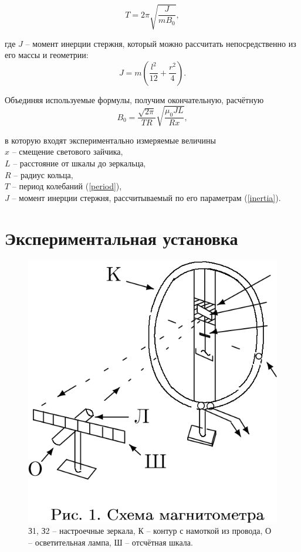 \documentclass[a4paper, 12pt]{article}
\begin{document}
\begin{equation}\label{period}
T = 2\pi\sqrt{\frac{J}{mB_0}},
\end{equation}

где $J$ -- момент инерции стержня, который можно рассчитать непосредственно из его массы и геометрии:
\begin{equation}\label{inertia}
J=m\left(\frac{l^2}{12}+\frac{r^2}{4}\right).
\end{equation}


Объединяя используемые формулы, получим окончательную, расчётную
\begin{equation}
B_0 = \frac{\sqrt{2\pi}}{TR}\sqrt{\frac{\mu_0JL}{Rx}},
\end{equation}

в которую входят экспериментально измеряемые величины\\
$x$ -- смещение светового зайчика,\\
$L$ -- расстояние от шкалы до зеркальца,\\
$R$ -- радиус кольца,\\
$T$ -- период колебаний (\ref{period}),\\
$J$ -- момент инерции стержня, рассчитываемый по его параметрам (\ref{inertia}).

\section*{Экспериментальная установка}

\begin{figure}[H]
\centering
\includegraphics[scale=0.5]{1}
\caption{З1, З2 -- настроечные зеркала, К -- контур с намоткой из провода, О -- осветительная лампа, Ш -- отсчётная шкала.}
\end{figure}
\end{document}
